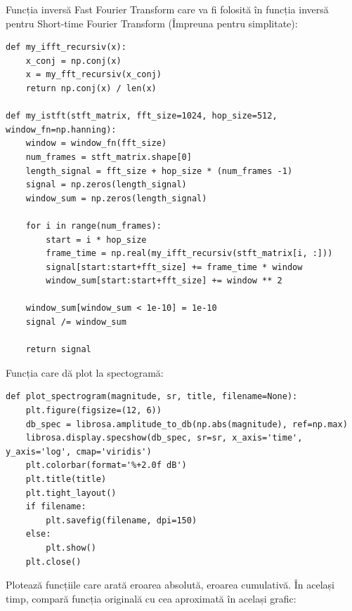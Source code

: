 \documentclass[12pt]{article}
\begin{document}
Funcția inversă Fast Fourier Transform care va fi folosită în funcția inversă pentru Short-time Fourier Transform (Împreuna pentru simplitate):

\begin{lstlisting}
def my_ifft_recursiv(x):
    x_conj = np.conj(x)
    x = my_fft_recursiv(x_conj)
    return np.conj(x) / len(x)

def my_istft(stft_matrix, fft_size=1024, hop_size=512, window_fn=np.hanning):
    window = window_fn(fft_size)
    num_frames = stft_matrix.shape[0]
    length_signal = fft_size + hop_size * (num_frames -1)
    signal = np.zeros(length_signal)
    window_sum = np.zeros(length_signal)

    for i in range(num_frames):
        start = i * hop_size
        frame_time = np.real(my_ifft_recursiv(stft_matrix[i, :]))
        signal[start:start+fft_size] += frame_time * window
        window_sum[start:start+fft_size] += window ** 2
    
    window_sum[window_sum < 1e-10] = 1e-10
    signal /= window_sum

    return signal
\end{lstlisting}

Funcția care dă plot la spectogramă:

\begin{lstlisting}
def plot_spectrogram(magnitude, sr, title, filename=None):
    plt.figure(figsize=(12, 6))
    db_spec = librosa.amplitude_to_db(np.abs(magnitude), ref=np.max)
    librosa.display.specshow(db_spec, sr=sr, x_axis='time', y_axis='log', cmap='viridis')
    plt.colorbar(format='%+2.0f dB')
    plt.title(title)
    plt.tight_layout()
    if filename:
        plt.savefig(filename, dpi=150)
    else:
        plt.show()
    plt.close()
\end{lstlisting}

Plotează funcțiile care arată eroarea absolută, eroarea cumulativă. În același timp, compară funcția originală cu cea aproximată în același grafic:
\end{document}

